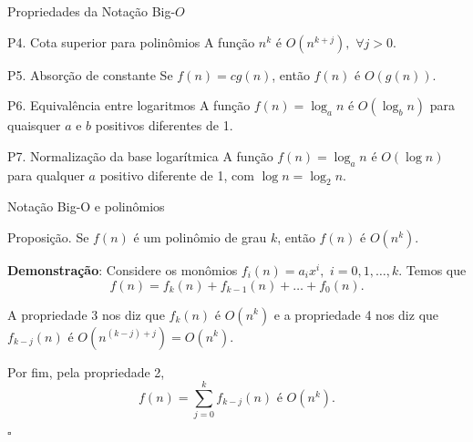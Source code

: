 \begin{frame}[fragile]{Propriedades da Notação Big-$O$}

	\begin{block}{P4. Cota superior para polinômios}
        A função $n^k$ é $O(n^{k+j}), \, \, \forall j > 0$.
	\end{block}

    \vspace{0.1in}

	\begin{block}{P5. Absorção de constante}
        Se $f(n) = cg(n)$, então $f(n)$ é $O(g(n))$.
	\end{block}

    \vspace{0.1in}

	\begin{block}{P6. Equivalência entre logaritmos}
		A função $f(n) = \log_a n$ é $O(\log_b n)$ para 
		{quaisquer} $a$ e $b$ {positivos} diferentes de 1.
	\end{block}

    \vspace{0.1in}

	\begin{block}{P7. Normalização da base logarítmica}
		A função $f(n) = \log_a n$ é $O(\log n)$ para 
		{qualquer} $a$ {positivo} diferente de 1, com $\log n = \log_2 n$.
	\end{block}

\end{frame}

\begin{frame}[fragile]{Notação Big-O e polinômios}

	\begin{block}{Proposição.}
	Se $f(n)$ é um polinômio de grau $k$, então $f(n)$ é $O(n^k)$.
	\end{block}

	\textbf{Demonstração}: Considere os {monômios} 
	$f_i(n) = a_ix^i,\, \, i = 0, 1, \ldots, k$.  Temos que
	$$
		f(n) = f_k(n) + f_{k-1}(n) + \ldots + f_0(n).
	$$

	A {propriedade} 3 nos diz que $f_k(n)$ é $O(n^k)$ e a 
	{propriedade} 4 
	nos diz que $f_{k-j}(n)$ é $O(n^{(k-j) + j}) = O(n^k)$.

	Por fim, pela {propriedade} 2, 
	\[f(n) = \sum_{j=0}^{k} f_{k - j}(n)\, \, \mbox{é}\, \, O(n^k).\]
	\begin{flushright}
    $\square$
	\end{flushright}

\end{frame}

